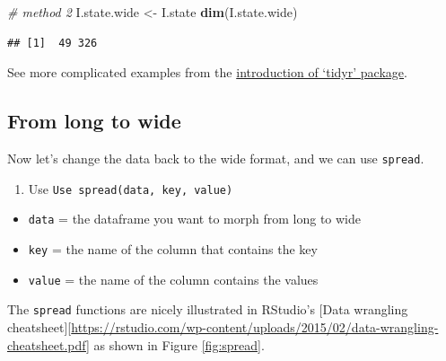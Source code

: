 \documentclass[]{book}
\newenvironment{Shaded}{\begin{snugshade}}{\end{snugshade}}
\newcommand{\KeywordTok}[1]{\textcolor[rgb]{0.13,0.29,0.53}{\textbf{#1}}}
\newcommand{\DataTypeTok}[1]{\textcolor[rgb]{0.13,0.29,0.53}{#1}}
\newcommand{\FloatTok}[1]{\textcolor[rgb]{0.00,0.00,0.81}{#1}}
\newcommand{\StringTok}[1]{\textcolor[rgb]{0.31,0.60,0.02}{#1}}
\newcommand{\CommentTok}[1]{\textcolor[rgb]{0.56,0.35,0.01}{\textit{#1}}}
\newcommand{\OperatorTok}[1]{\textcolor[rgb]{0.81,0.36,0.00}{\textbf{#1}}}
\newcommand{\NormalTok}[1]{#1}
\providecommand{\tightlist}{%
  \setlength{\itemsep}{0pt}\setlength{\parskip}{0pt}}
\begin{document}
\begin{Shaded}
\begin{Highlighting}[]
\CommentTok{# method 2}
\NormalTok{I.state.wide <-}\StringTok{ }\NormalTok{I.state }
\KeywordTok{dim}\NormalTok{(I.state.wide) }
\end{Highlighting}
\end{Shaded}

\begin{verbatim}
## [1]  49 326
\end{verbatim}

\begin{Shaded}
\end{Shaded}

See more complicated examples from the
\href{https://tidyr.tidyverse.org/reference/pivot_longer.html}{introduction
of `tidyr' package}.

\subsection{From long to wide}\label{from-long-to-wide}

Now let's change the data back to the wide format, and we can use
\texttt{spread}.

\begin{enumerate}
\def\labelenumi{\arabic{enumi}.}
\tightlist
\item
  Use \texttt{Use\ spread(data,\ key,\ value)}
\end{enumerate}

\begin{itemize}
\tightlist
\item
  \texttt{data} = the dataframe you want to morph from long to wide
\item
  \texttt{key} = the name of the column that contains the key
\item
  \texttt{value} = the name of the column contains the values
\end{itemize}

The \texttt{spread} functions are nicely illustrated in RStudio's
{[}Data wrangling
cheatsheet{]}{[}\url{https://rstudio.com/wp-content/uploads/2015/02/data-wrangling-cheatsheet.pdf}{]}
as shown in Figure \ref{fig:spread}.
\end{document}
